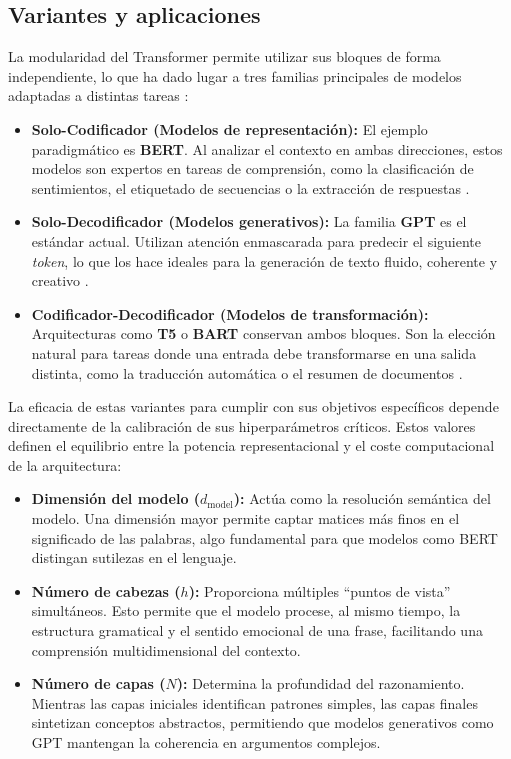 \documentclass[12pt,a4paper]{report}
\begin{document}
\subsection{Variantes y aplicaciones}
\label{subsec:variantes_transformer}

La modularidad del Transformer permite utilizar sus bloques de forma independiente, lo que ha dado lugar a tres familias principales de modelos adaptadas a distintas tareas \cite{vaswani_attention_2017}:

\begin{itemize}
    \item \textbf{Solo-Codificador (Modelos de representación):} El ejemplo paradigmático es \textbf{BERT}. Al analizar el contexto en ambas direcciones, estos modelos son expertos en tareas de comprensión, como la clasificación de sentimientos, el etiquetado de secuencias o la extracción de respuestas \cite{devlin_bert_2018}.
    
    \item \textbf{Solo-Decodificador (Modelos generativos):} La familia \textbf{GPT} es el estándar actual. Utilizan atención enmascarada para predecir el siguiente \textit{token}, lo que los hace ideales para la generación de texto fluido, coherente y creativo \cite{brown_language_2020}.
    
    \item \textbf{Codificador-Decodificador (Modelos de transformación):} Arquitecturas como \textbf{T5} o \textbf{BART} conservan ambos bloques. Son la elección natural para tareas donde una entrada debe transformarse en una salida distinta, como la traducción automática o el resumen de documentos \cite{lewis_bart_2020}.
\end{itemize}

La eficacia de estas variantes para cumplir con sus objetivos específicos depende directamente de la calibración de sus hiperparámetros críticos. Estos valores definen el equilibrio entre la potencia representacional y el coste computacional de la arquitectura:

\begin{itemize}
    \item \textbf{Dimensión del modelo ($d_{\mathrm{model}}$):} Actúa como la resolución semántica del modelo. Una dimensión mayor permite captar matices más finos en el significado de las palabras, algo fundamental para que modelos como BERT distingan sutilezas en el lenguaje.
    
    \item \textbf{Número de cabezas ($h$):} Proporciona múltiples ``puntos de vista'' simultáneos. Esto permite que el modelo procese, al mismo tiempo, la estructura gramatical y el sentido emocional de una frase, facilitando una comprensión multidimensional del contexto.
    
    \item \textbf{Número de capas ($N$):} Determina la profundidad del razonamiento. Mientras las capas iniciales identifican patrones simples, las capas finales sintetizan conceptos abstractos, permitiendo que modelos generativos como GPT mantengan la coherencia en argumentos complejos.
\end{itemize}
\end{document}
